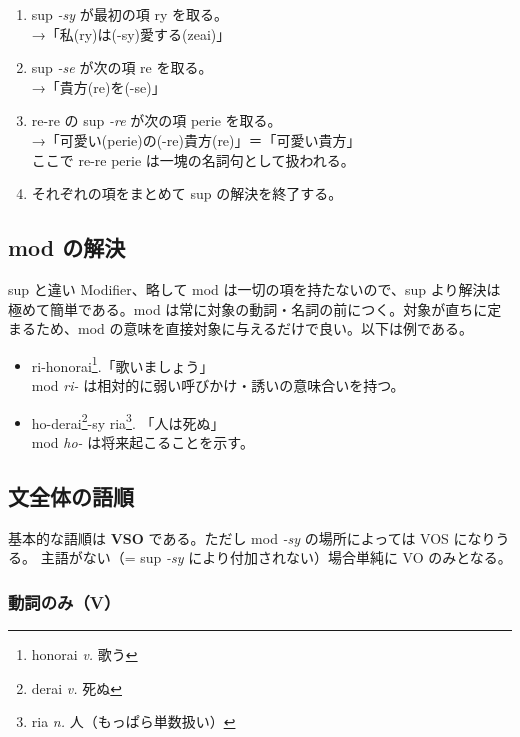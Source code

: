\begin{enumerate}
    \item sup \emph{-sy} が最初の項 ry を取る。\\ →「私(ry)は(-sy)愛する(zeai)」
    \item sup \emph{-se} が次の項 re を取る。 \\ →「貴方(re)を(-se)」
    \item re-re の sup \emph{-re} が次の項 perie を取る。 \\ →「可愛い(perie)の(-re)貴方(re)」＝「可愛い貴方」\\ ここで re-re perie は一塊の名詞句として扱われる。
    \item それぞれの項をまとめて sup の解決を終了する。
\end{enumerate}

\subsection{mod の解決}

sup と違い Modifier、略して mod は一切の項を持たないので、sup より解決は極めて簡単である。mod は常に対象の動詞・名詞の前につく。対象が直ちに定まるため、mod の意味を直接対象に与えるだけで良い。以下は例である。

\begin{itemize}
    \item ri-honorai\footnote{honorai \emph{v.} 歌う}.「歌いましょう」\\ mod \emph{ri-} は相対的に弱い呼びかけ・誘いの意味合いを持つ。
    \item ho-derai\footnote{derai \emph{v.} 死ぬ}-sy ria\footnote{ria \emph{n.} 人（もっぱら単数扱い）}. 「人は死ぬ」\\ mod \emph{ho-} は将来起こることを示す。
\end{itemize}

\clearpage

\subsection{文全体の語順}

基本的な語順は \textbf{VSO} である。ただし mod \emph{-sy} の場所によっては VOS になりうる。
主語がない（= sup \emph{-sy} により付加されない）場合単純に VO のみとなる。

\subsubsection{動詞のみ（V）}

